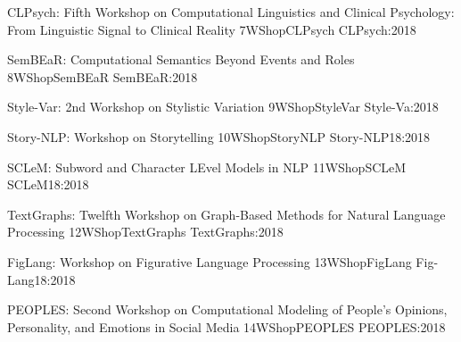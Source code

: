 \begin{wsschedule}
  {CLPsych: Fifth Workshop on Computational Linguistics and Clinical Psychology: From Linguistic Signal to Clinical Reality}
  {7}{WShopCLPsych}
  {CLPsych:2018}
  {\WShopLocCLPsych}
  
\end{wsschedule}

\begin{wsschedule}
  {SemBEaR: Computational Semantics Beyond Events and Roles}
  {8}{WShopSemBEaR}
  {SemBEaR:2018}
  {\WShopLocSemBEaR}
  
\end{wsschedule}

\begin{wsschedule}
  {Style-Var: 2nd Workshop on Stylistic Variation}
  {9}{WShopStyleVar}
  {Style-Va:2018}
  {\WShopLocStyleVar}
  
\end{wsschedule}

\begin{wsschedule}
  {Story-NLP: Workshop on Storytelling}
  {10}{WShopStoryNLP}
  {Story-NLP18:2018}
  {\WShopLocStoryNLP}
  
\end{wsschedule}


\clearpage
{}

\begin{wsschedule}
  {SCLeM: Subword and Character LEvel Models in NLP}
  {11}{WShopSCLeM}
  {SCLeM18:2018}
  {\WShopLocSCLeM}
  
\end{wsschedule}

  \begin{wsschedule}
   {TextGraphs: Twelfth Workshop on Graph-Based Methods for Natural Language Processing}
   {12}{WShopTextGraphs}
   {TextGraphs:2018}
   {\WShopLocTextGraphs}
   
 \end{wsschedule}
 
  \begin{wsschedule}
   {FigLang: Workshop on Figurative Language Processing}
   {13}{WShopFigLang}
   {Fig-Lang18:2018}
   {\WShopLocFigLang}
   
 \end{wsschedule}

   \begin{wsschedule}
   {PEOPLES: Second Workshop on Computational Modeling of People's Opinions, Personality, and Emotions in Social Media}
   {14}{WShopPEOPLES}
   {PEOPLES:2018}
   {\WShopLocPEOPLES}
   
 \end{wsschedule}

